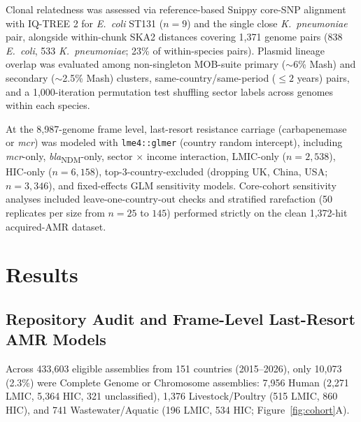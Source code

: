 \documentclass[11pt,a4paper]{article}
\begin{document}
Clonal relatedness was assessed via reference-based Snippy core-SNP alignment with IQ-TREE 2 \cite{minh2020} for \textit{E.~coli} ST131 ($n = 9$) and the single close \textit{K.~pneumoniae} pair, alongside within-chunk SKA2 distances \cite{derelle2024} covering 1,371 genome pairs (838 \textit{E.~coli}, 533 \textit{K.~pneumoniae}; 23\% of within-species pairs). Plasmid lineage overlap was evaluated among non-singleton MOB-suite primary ($\sim$6\% Mash) and secondary ($\sim$2.5\% Mash) clusters, same-country/same-period ($\le 2$ years) pairs, and a 1,000-iteration permutation test shuffling sector labels across genomes within each species.

At the 8,987-genome frame level, last-resort resistance carriage (carbapenemase or \textit{mcr}) was modeled with \texttt{lme4::glmer} \cite{bates2015} (country random intercept), including \textit{mcr}-only, \textit{bla}\textsubscript{NDM}-only, sector $\times$ income interaction, LMIC-only ($n = 2{,}538$), HIC-only ($n = 6{,}158$), top-3-country-excluded (dropping UK, China, USA; $n = 3{,}346$), and fixed-effects GLM sensitivity models. Core-cohort sensitivity analyses included leave-one-country-out checks and stratified rarefaction (50 replicates per size from $n = 25$ to $145$) performed strictly on the clean 1,372-hit acquired-AMR dataset.

\section{Results}

\subsection{Repository Audit and Frame-Level Last-Resort AMR Models}

Across 433,603 eligible assemblies from 151 countries (2015--2026), only 10,073 (2.3\%) were Complete Genome or Chromosome assemblies: 7,956 Human (2,271 LMIC, 5,364 HIC, 321 unclassified), 1,376 Livestock/Poultry (515 LMIC, 860 HIC), and 741 Wastewater/Aquatic (196 LMIC, 534 HIC; Figure~\ref{fig:cohort}A).
\end{document}
